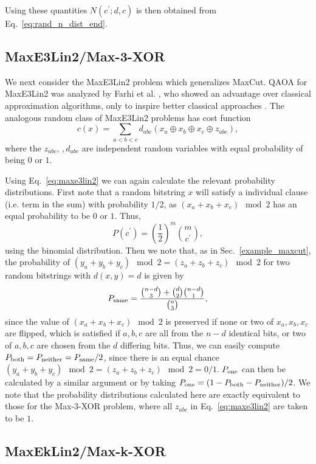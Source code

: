 \documentclass[superscriptaddress,pra,aps,10pt,longbibliography,notitlepage]{revtex4-1}
\newcommand{\Prob}[1]{\ensuremath{P_{\textnormal{#1}}}}
\newcommand{\Psame}{\Prob{same}}
\newcommand{\Pboth}{\Prob{both}}
\newcommand{\Pone}{\Prob{one}}
\newcommand{\Pneither}{\Prob{neither}}
\newcommand*\cp{c^\prime}
\begin{document}
Using these quantities $N(\cp;d,c)$ is then obtained from Eq.~\ref{eq:rand_n_dist_end}.

\subsection{MaxE3Lin2/Max-3-XOR}
We next consider the MaxE3Lin2 problem 
which generalizes MaxCut. QAOA for MaxE3Lin2 was analyzed by Farhi et al. \cite{farhi14}, who showed an advantage over classical approximation algorithms, only to inspire better classical approaches \cite{barak2015beating,hastings19}. The analogous random class of MaxE3Lin2 problems has cost function
\begin{equation}\label{eq:maxe3lin2}
    c(x) = \sum_{a<b<c} d_{abc}(x_a \oplus x_b \oplus x_c \oplus z_{abc}),
\end{equation}
where the $z_{abc}$, $,d_{abc}$ are independent random variables with equal probability of being $0$ or $1$. 

Using Eq.~\eqref{eq:maxe3lin2} we can again calculate the relevant probability distributions. First note that a random bitstring $x$ will satisfy a individual clause (i.e. term in the sum) with probability $1/2$, as $(x_a + x_b + x_c) \mod 2$ has an equal probability to be $0$ or $1$. Thus,
\begin{equation}
    P(\cp) = \left(\frac{1}{2}\right)^m \binom{m}{\cp},
\end{equation}
using the binomial distribution. Then we note that, as in Sec.~\ref{example_maxcut}, the probability of $(y_a + y_b + y_c) \mod 2 = (z_a + z_b + z_c) \mod 2$ for two random bitstrings with $d(x,y)=d$ is given by 
\begin{equation}
    \Psame = \frac{\binom{n-d}{3}+\binom{d}{2}\binom{n-d}{1}}{\binom{n}{3}},
\end{equation}
since the value of $(x_a + x_b + x_c) \mod 2$ is preserved if none or two of $x_a,x_b,x_c$ are flipped, which is satisfied if $a,b,c$ are all from the $n-d$ identical bits, or two of $a,b,c$ are chosen from the $d$ differing bits. Thus, we can easily compute $\Pboth=\Pneither=\Psame/2$, since there is an equal chance $(y_a + y_b + y_c) \mod 2 = (z_a + z_b + z_c) \mod 2 = 0/1$. $\Pone$ can then be calculated by a similar argument or by taking $\Pone=(1-\Pboth-\Pneither)/2$. We note that the probability distributions calculated here are exactly equivalent to those for the Max-3-XOR problem, where all $z_{abc}$ in Eq.~\eqref{eq:maxe3lin2} are taken to be $1$.


\subsection{MaxEkLin2/Max-k-XOR}
\end{document}
